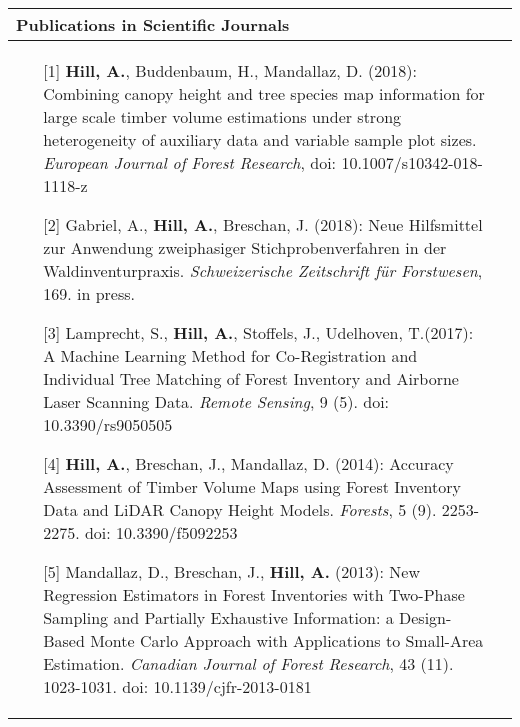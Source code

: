 \noindent
\begin{tabular*}{\textwidth}{p{}p{}}
	\multicolumn{2}{l}{\large Publications in Scientific Journals}\\
	\toprule
\begin{enumerate}[]
	
		\item [{[1]}] \textbf{Hill, A.}, Buddenbaum, H., Mandallaz, D. (2018): Combining canopy height and tree species map information for large scale timber volume estimations under strong heterogeneity of auxiliary data and variable sample plot sizes. \textit{European Journal of Forest Research}, doi: 10.1007/s10342-018-1118-z
	
	 	\item [{[2]}] Gabriel, A., \textbf{Hill, A.}, Breschan, J. (2018): Neue Hilfsmittel zur Anwendung zweiphasiger Stichprobenverfahren in der Waldinventurpraxis. \textit{Schweizerische Zeitschrift f{\"u}r Forstwesen}, 169. in press.
	
		\item [{[3]}] Lamprecht, S., \textbf{Hill, A.}, Stoffels, J., Udelhoven, T.(2017): A Machine Learning Method for Co-Registration and Individual Tree Matching of Forest Inventory and Airborne Laser Scanning Data. \textit{Remote Sensing}, 9 (5). doi: 10.3390/rs9050505
		
		\item [{[4]}] \textbf{Hill, A.}, Breschan, J., Mandallaz, D. (2014): Accuracy Assessment of Timber Volume Maps using Forest Inventory Data and LiDAR Canopy Height Models. \textit{Forests}, 5 (9). 2253-2275. doi: 10.3390/f5092253
			
		\item [{[5]}] Mandallaz, D., Breschan, J., \textbf{Hill, A.} (2013): New Regression Estimators in Forest Inventories with Two-Phase Sampling and Partially Exhaustive Information: a Design-Based Monte Carlo Approach with Applications to Small-Area Estimation. \textit{Canadian Journal of Forest Research}, 43 (11). 1023-1031. doi: 10.1139/cjfr-2013-0181
	
\end{enumerate}
	&\\
\end{tabular*}

